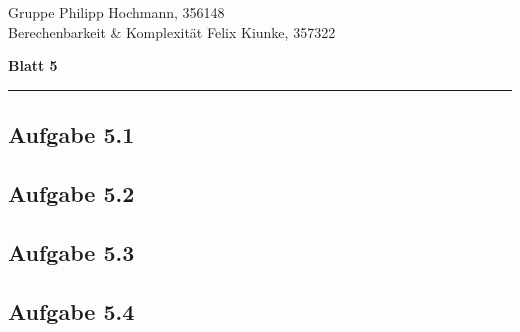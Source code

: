 \documentclass[a4paper,graphics,11pt]{article}
\newcommand\aufgabe[1]{\subsection*{Aufgabe #1}}
\begin{document}
\noindent Gruppe              \hfill Philipp Hochmann, 356148 \\
\noindent Berechenbarkeit \& Komplexität \hfill Felix Kiunke, 357322 \\

\begin{center}
	\LARGE{\textbf{Blatt 5}}
\end{center}
\begin{center}
\rule[0.1ex]{\textwidth}{1pt}
\end{center}

\aufgabe{5.1}

\aufgabe{5.2}

\aufgabe{5.3}

\aufgabe{5.4}

\end{document}
